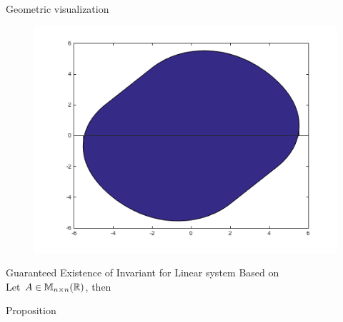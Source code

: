 \begin{frame}{Geometric visualization}
\begin{minipage}{0.45\textwidth}
\begin{figure}
\includegraphics[scale=0.2]{fig/CZhull.png}
\end{figure}
\end{minipage}
\end{frame}


\begin{frame}{Guaranteed Existence of Invariant for Linear system}
Based on  \\
Let $A\in\mathbb{M}_{n\times n}(\mathbb{R})$, then
\large{
\begin{block}{Proposition}
\end{block}
}
\end{frame}


